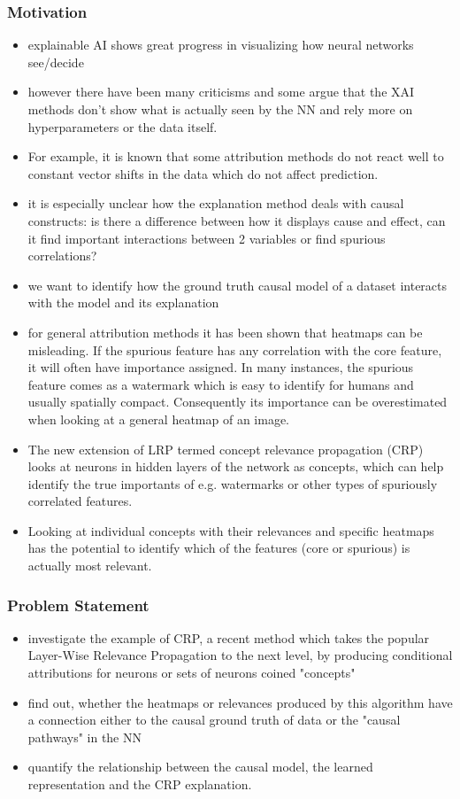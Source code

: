 \subsubsection*{Motivation}
\begin{itemize}
    \item explainable AI shows great progress in visualizing how neural networks see/decide
    \item however there have been many criticisms and some argue that the XAI methods don't show what is actually seen by the NN and rely more on hyperparameters or the data itself.
    \item For example, it is known that some attribution methods do not react well to constant vector shifts in the data which do not affect prediction.
    \item it is especially unclear how the explanation method deals with causal constructs: is there a difference between how it displays cause and effect, can it find important interactions between 2 variables or find spurious correlations?
    \item we want to identify how the ground truth causal model of a dataset interacts with the model and its explanation
    \item for general attribution methods it has been shown that heatmaps can be misleading. If the spurious feature has any correlation with the core feature, it will often have importance assigned. In many instances, the spurious feature comes as a watermark which is easy to identify for humans and usually spatially compact. Consequently its importance can be overestimated when looking at a general heatmap of an image.
    \item The new extension of LRP termed concept relevance propagation (CRP) looks at neurons in hidden layers of the network as concepts, which can help identify the true importants of e.g. watermarks or other types of spuriously correlated features. 
    \item Looking at individual concepts with their relevances and specific heatmaps has the potential to identify which of the features (core or spurious) is actually most relevant.
\end{itemize}

\subsubsection*{Problem Statement}
\begin{itemize}
    \item investigate the example of CRP, a recent method which takes the popular Layer-Wise Relevance Propagation to the next level, by producing conditional attributions for neurons or sets of neurons coined "concepts"
    \item find out, whether the heatmaps or relevances produced by this algorithm have a connection either to the causal ground truth of data or the "causal pathways" in the NN
    \item quantify the relationship between the causal model, the learned representation and the CRP explanation.
\end{itemize}

